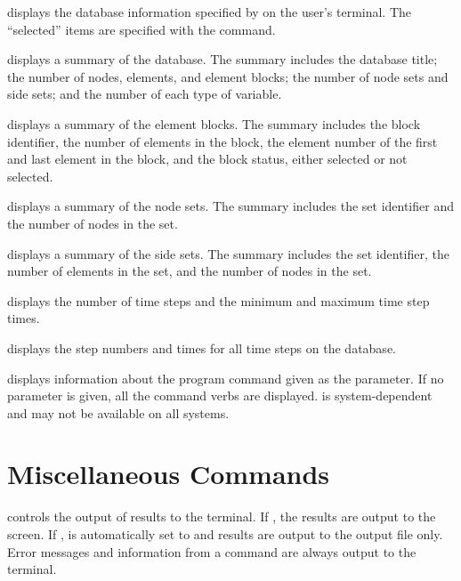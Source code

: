  {
 displays the database information specified by 
on the user's terminal. The ``selected'' items are specified with the
 command.

 {
displays a summary of the database. The summary includes the database
title; the number of nodes, elements, and element blocks; the number of
node sets and side sets; and the number of each type of
variable.
}

 {
displays a summary of the element blocks. The summary includes
the block identifier, the number of elements in the block, the element
number of the first and last element in the block, and the block status,
either selected or not selected.
}

 {
displays a summary of the node sets. The summary
includes the set identifier and the number of nodes in the set.
}

 {
displays a summary of the side sets. The summary
includes the set identifier, the number of elements in the set, and the
number of nodes in the set.
}

 {
displays the number of time steps and the minimum and maximum time step
times.
}

 {
displays the step numbers and times for all time steps on the database.
}
}

\filbreak
{} {
 displays information about the program command given as the
parameter. If no parameter is given, all the command verbs are
displayed.  is system-dependent and may not be available on
all systems.
}
\filbreak
\section{Miscellaneous Commands}\label{sec:misc}

 {
 controls the output of results to the terminal.  If ,
the results are output to the screen. If ,  is
automatically set to  and results are output to the output file
only.  Error messages and information from a  command are
always output to the terminal. 
}

